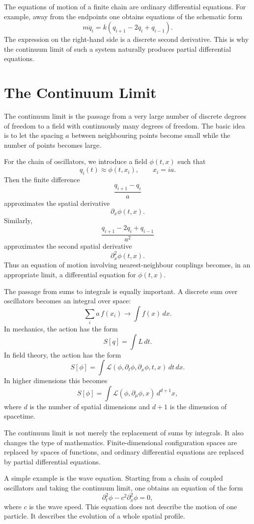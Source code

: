The equations of motion of a finite chain are ordinary differential equations.
For example, away from the endpoints one obtains equations of the schematic
form
\[
    m\ddot q_i = k(q_{i+1}-2q_i+q_{i-1}).
\]
The expression on the right-hand side is a discrete second derivative. This is
why the continuum limit of such a system naturally produces partial
differential equations.

\section{The Continuum Limit}

The continuum limit is the passage from a very large number of discrete degrees
of freedom to a field with continuously many degrees of freedom. The basic idea
is to let the spacing \(a\) between neighbouring points become small while the
number of points becomes large.

For the chain of oscillators, we introduce a field \(\phi(t,x)\) such that
\[
    q_i(t) \approx \phi(t,x_i),
    \qquad x_i = ia.
\]
Then the finite difference
\[
    \frac{q_{i+1}-q_i}{a}
\]
approximates the spatial derivative
\[
    \partial_x \phi(t,x).
\]
Similarly,
\[
    \frac{q_{i+1}-2q_i+q_{i-1}}{a^2}
\]
approximates the second spatial derivative
\[
    \partial_x^2 \phi(t,x).
\]
Thus an equation of motion involving nearest-neighbour couplings becomes, in an
appropriate limit, a differential equation for \(\phi(t,x)\).

The passage from sums to integrals is equally important. A discrete sum over
oscillators becomes an integral over space:
\[
    \sum_i a\, f(x_i) \longrightarrow \int f(x)\,dx.
\]
In mechanics, the action has the form
\[
    S[q] = \int L\,dt.
\]
In field theory, the action has the form
\[
    S[\phi] = \int \mathcal{L}(\phi,\partial_t\phi,\partial_x\phi,t,x)\,dt\,dx.
\]
In higher dimensions this becomes
\[
    S[\phi] = \int \mathcal{L}(\phi,\partial_\mu\phi,x)\,d^{d+1}x,
\]
where \(d\) is the number of spatial dimensions and \(d+1\) is the dimension of
spacetime.

\begin{remarkbox}
The continuum limit is not merely the replacement of sums by integrals. It also
changes the type of mathematics. Finite-dimensional configuration spaces are
replaced by spaces of functions, and ordinary differential equations are
replaced by partial differential equations.
\end{remarkbox}

A simple example is the wave equation. Starting from a chain of coupled
oscillators and taking the continuum limit, one obtains an equation of the form
\[
    \partial_t^2 \phi - c^2\partial_x^2\phi = 0,
\]
where \(c\) is the wave speed. This equation does not describe the motion of one
particle. It describes the evolution of a whole spatial profile.

